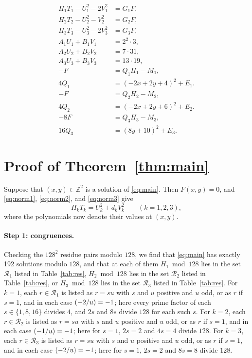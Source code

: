\documentclass[11pt]{article}
\newcommand{\Z}{\mathbb{Z}}
\newcommand{\leg}[2]{\mathchoice{\biggl(\dfrac{#1}{#2}\biggr)}{(#1/#2)}{(#1/#2)}{(#1/#2)}}
\begin{document}
\begin{align}
H_{1}T_{1}-U_{1}^2-2V_{1}^2&=G_{1}F,\label{eq:norm1}\\
H_{2}T_{2}-U_{2}^2-V_{2}^2&=G_{2}F,\label{eq:norm2}\\
H_{3}T_{3}-U_{3}^2-2V_{3}^2&=G_{3}F,\label{eq:norm3}\\
A_{1}U_{1}+B_{1}V_{1}&=2^{2}\cdot 3,\label{eq:bez1}\\
A_{2}U_{2}+B_{2}V_{2}&=7\cdot 31,\label{eq:bez2}\\
A_{3}U_{3}+B_{3}V_{3}&=13\cdot 19,\label{eq:bez3}\\
-F&=Q_{1}H_{1}-M_{1},\label{eq:sign1}\\
4Q_{1}&=(-2x+2y+4)^2+E_{1}.\label{eq:sign1b}\\
-F&=Q_{2}H_{2}-M_{2},\label{eq:sign2}\\
4Q_{2}&=(-2x+2y+6)^2+E_{2}.\label{eq:sign2b}\\
-8F&=Q_{3}H_{3}-M_{3},\label{eq:sign3}\\
16Q_{3}&=(8y+10)^2+E_{3}.\label{eq:sign3b}
\end{align}

\section{Proof of Theorem~\ref{thm:main}}

Suppose that $(x,y)\in\Z^2$ is a solution of \eqref{eq:main}. Then $F(x,y)=0$, and \eqref{eq:norm1}, \eqref{eq:norm2}, and \eqref{eq:norm3} give
\begin{equation}\label{eq:HT}
H_kT_k=U_k^2+d_kV_k^2\qquad(k=1,2,3),
\end{equation}
where the polynomials now denote their values at $(x,y)$.

\paragraph{Step 1: congruences.} Checking the $128^2$ residue pairs modulo $128$, we find that \eqref{eq:main} has exactly 192 solutions modulo $128$, and that at each of them $H_{1}\bmod 128$ lies in the set $\mathcal R_{1}$ listed in Table~\ref{tab:res}, $H_{2}\bmod 128$ lies in the set $\mathcal R_{2}$ listed in Table~\ref{tab:res}, or $H_{3}\bmod 128$ lies in the set $\mathcal R_{3}$ listed in Table~\ref{tab:res}. For $k=1$, each $r\in\mathcal R_{1}$ is listed as $r=su$ with $s$ and $u$ positive and $u$ odd, or as $r$ if $s=1$, and in each case $\leg{-2}{u}=-1$; here every prime factor of each $s\in\{1,8,16\}$ divides $4$, and $2s$ and $8s$ divide $128$ for each such $s$. For $k=2$, each $r\in\mathcal R_{2}$ is listed as $r=su$ with $s$ and $u$ positive and $u$ odd, or as $r$ if $s=1$, and in each case $\leg{-1}{u}=-1$; here for $s=1$, $2s=2$ and $4s=4$ divide $128$. For $k=3$, each $r\in\mathcal R_{3}$ is listed as $r=su$ with $s$ and $u$ positive and $u$ odd, or as $r$ if $s=1$, and in each case $\leg{-2}{u}=-1$; here for $s=1$, $2s=2$ and $8s=8$ divide $128$.
\end{document}
